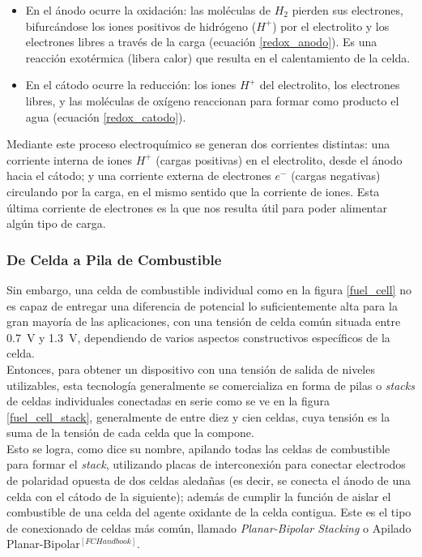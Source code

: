 \begin{itemize}
    \item {\SemiBold En el ánodo ocurre la oxidación:} las moléculas de $H_2$ pierden sus electrones, bifurcándose los iones positivos de hidrógeno ($H^{+}$) por el electrolito y los electrones libres a través de la carga (ecuación \ref{redox_anodo}). Es una reacción exotérmica (libera calor) que resulta en el calentamiento de la celda.
    \item {\SemiBold En el cátodo ocurre la reducción:} los iones $H^{+}$ del electrolito, los electrones libres, y las moléculas de oxígeno reaccionan para formar como producto el agua (ecuación \ref{redox_catodo}).
\end{itemize}

Mediante este proceso electroquímico se generan dos corrientes distintas: una corriente interna de iones $H^{+}$ (cargas positivas) en el electrolito, desde el ánodo hacia el cátodo; y una corriente externa de electrones $e^-$ (cargas negativas) circulando por la carga, en el mismo sentido que la corriente de iones. Esta última corriente de electrones es la que nos resulta útil para poder alimentar algún tipo de carga.\\

\subsubsection{De Celda a Pila de Combustible}

Sin embargo, una celda de combustible individual como en la figura \ref{fuel_cell} no es capaz de entregar una diferencia de potencial lo suficientemente alta para la gran mayoría de las aplicaciones, con una tensión de celda común situada entre \SI{0.7}{\volt} y \SI{1.3}{\volt}, dependiendo de varios aspectos constructivos específicos de la celda.\\

Entonces, para obtener un dispositivo con una tensión de salida de niveles utilizables, esta tecnología generalmente se comercializa en forma de pilas o \textit{stacks} de celdas individuales conectadas en serie como se ve en la figura \ref{fuel_cell_stack}, generalmente de entre diez y cien celdas, cuya tensión es la suma de la tensión de cada celda que la compone.\\

Esto se logra, como dice su nombre, apilando todas las celdas de combustible para formar el \textit{stack}, utilizando placas de interconexión para conectar electrodos de polaridad opuesta de dos celdas aledañas (es decir, se conecta el ánodo de una celda con el cátodo de la siguiente); además de cumplir la función de aislar el combustible de una celda del agente oxidante de la celda contigua. Este es el tipo de conexionado de celdas más común, llamado \textit{Planar-Bipolar Stacking} o Apilado Planar-Bipolar$^{[FCHandbook]}$.

